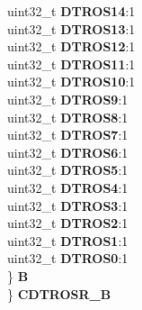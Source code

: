 \begin{DoxyCompactItemize}
\begin{tabbing}
\>\>uint32\_t {\bfseries DTROS14}:1\\
\>\>uint32\_t {\bfseries DTROS13}:1\\
\>\>uint32\_t {\bfseries DTROS12}:1\\
\>\>uint32\_t {\bfseries DTROS11}:1\\
\>\>uint32\_t {\bfseries DTROS10}:1\\
\>\>uint32\_t {\bfseries DTROS9}:1\\
\>\>uint32\_t {\bfseries DTROS8}:1\\
\>\>uint32\_t {\bfseries DTROS7}:1\\
\>\>uint32\_t {\bfseries DTROS6}:1\\
\>\>uint32\_t {\bfseries DTROS5}:1\\
\>\>uint32\_t {\bfseries DTROS4}:1\\
\>\>uint32\_t {\bfseries DTROS3}:1\\
\>\>uint32\_t {\bfseries DTROS2}:1\\
\>\>uint32\_t {\bfseries DTROS1}:1\\
\>\>uint32\_t {\bfseries DTROS0}:1\\
\>\} {\bfseries B}\\
\} {\bfseries CDTROSR\_B}\\


\end{tabbing}
\end{DoxyCompactItemize}
